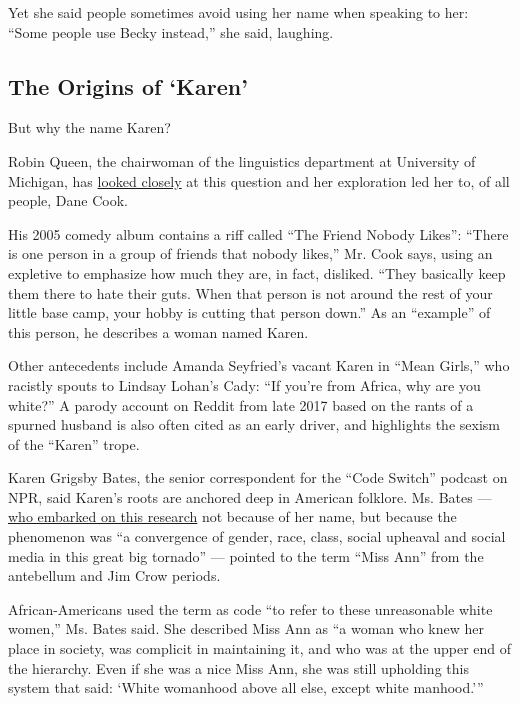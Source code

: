 Yet she said people sometimes avoid using her name when speaking to her:
``Some people use Becky instead,'' she said, laughing.

\hypertarget{the-origins-of-karen}{%
\subsection{The Origins of `Karen'}\label{the-origins-of-karen}}

But why the name Karen?

Robin Queen, the chairwoman of the linguistics department at University
of Michigan, has
\href{https://theconversation.com/how-karen-went-from-a-popular-baby-name-to-a-stand-in-for-white-entitlement-139644}{looked
closely} at this question and her exploration led her to, of all people,
Dane Cook.

His 2005 comedy album contains a riff called ``The Friend Nobody
Likes'': ``There is one person in a group of friends that nobody
likes,'' Mr. Cook says, using an expletive to emphasize how much they
are, in fact, disliked. ``They basically keep them there to hate their
guts. When that person is not around the rest of your little base camp,
your hobby is cutting that person down.'' As an ``example'' of this
person, he describes a woman named Karen.

Other antecedents include Amanda Seyfried's vacant Karen in ``Mean
Girls,'' who racistly spouts to Lindsay Lohan's Cady: ``If you're from
Africa, why are you white?'' A parody account on Reddit from late 2017
based on the rants of a spurned husband is also often cited as an early
driver, and highlights the sexism of the ``Karen'' trope.

Karen Grigsby Bates, the senior correspondent for the ``Code Switch''
podcast on NPR, said Karen's roots are anchored deep in American
folklore. Ms. Bates ---
\href{https://www.npr.org/transcripts/891177904}{who embarked on this
research} not because of her name, but because the phenomenon was ``a
convergence of gender, race, class, social upheaval and social media in
this great big tornado'' --- pointed to the term ``Miss Ann'' from the
antebellum and Jim Crow periods.

African-Americans used the term as code ``to refer to these unreasonable
white women,'' Ms. Bates said. She described Miss Ann as ``a woman who
knew her place in society, was complicit in maintaining it, and who was
at the upper end of the hierarchy. Even if she was a nice Miss Ann, she
was still upholding this system that said: `White womanhood above all
else, except white manhood.'''

